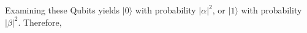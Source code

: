 \documentclass[preview]{standalone}
\begin{document}
\begin{center}
Examining these Qubits yields $ | 0 \rangle $ with probability $ | \alpha |^2 $, or $ |1 \rangle$ with probability $|\beta|^2$. Therefore,
\end{center}
\end{document}
